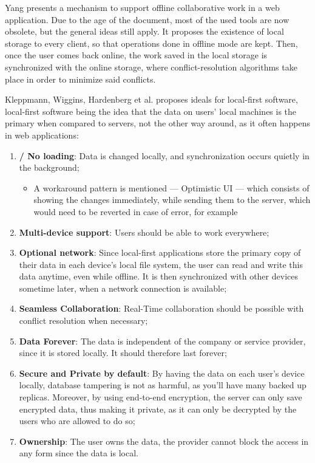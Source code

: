 Yang \cite{Yang2000} presents a mechanism to support offline collaborative work in a web application. Due to the age of the document, most of the used tools are now obsolete, but the general ideas still apply. It proposes the existence of local storage to every client, so that operations done in offline mode are kept. Then, once the user comes back online, the work saved in the local storage is synchronized with the online storage, where conflict-resolution algorithms take place in order to minimize said conflicts.

Kleppmann, Wiggins, Hardenberg et al. \cite{Kleppmann2019} proposes ideals for local-first software, local-first software being the idea that the data on users' local machines is the primary when compared to servers, not the other way around, as it often happens in web applications:

\begin{enumerate}
    \item \textbf{ / No loading}: Data is changed locally, and synchronization occurs quietly in the background;
    \begin{itemize}
        \item A workaround pattern is mentioned --- Optimistic UI --- which consists of showing the changes immediately, while sending them to the server, which would need to be reverted in case of error, for example
    \end{itemize}
    \item \textbf{Multi-device support}: Users should be able to work everywhere;
    \item \textbf{Optional network}: Since local-first applications store the primary copy of their data in each device’s local file system, the user can read and write this data anytime, even while offline. It is then synchronized with other devices sometime later, when a network connection is available;
    \item \textbf{Seamless Collaboration}: Real-Time collaboration should be possible with conflict resolution when necessary;
    \item \textbf{Data Forever}: The data is independent of the company or service provider, since it is stored locally. It should therefore last forever;
    \item \textbf{Secure and Private by default}: By having the data on each user's device locally, database tampering is not as harmful, as you'll have many backed up replicas. Moreover, by using end-to-end encryption, the server can only save encrypted data, thus making it private, as it can only be decrypted by the users who are allowed to do so;
    \item \textbf{Ownership}: The user owns the data, the provider cannot block the access in any form since the data is local.
\end{enumerate}

